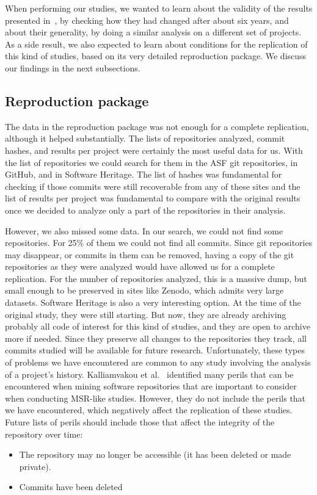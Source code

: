 When performing our studies, we wanted to learn about the validity of the results presented in~\cite{tufano2017there}, by checking how they had changed after about six years, and about their generality, by doing a similar analysis on a different set of projects. As a side result, we also expected to learn about conditions for the replication of this kind of studies, based on its very detailed reproduction package. We discuss our findings in the next subsections.

\subsection{Reproduction package}

The data in the reproduction package was not enough for a complete replication, although it helped substantially. The lists of repositories analyzed, commit hashes, and results per project were certainly the most useful data for us. With the list of repositories we could search for them in the ASF git repositories, in GitHub, and in Software Heritage. The list of hashes was fundamental for checking if those commits were still recoverable from any of these sites and the list of results per project was fundamental to compare with the original results once we decided to analyze only a part of the repositories in their analysis.

However, we also missed some data. In our search, we could not find some repositories. For 25\% of them we could not find all commits. Since git repositories may disappear, or commits in them can be removed, having a copy of the git repositories as they were analyzed would have allowed us for a complete replication. For the number of repositories analyzed, this is a massive dump, but small enough to be preserved in sites like Zenodo, which admits very large datasets. Software Heritage is also a very interesting option. At the time of the original study, they were still starting. But now, they are already archiving probably all code of interest for this kind of studies, and they are open to archive more if needed. Since they preserve all changes to the repositories they track, all commits studied will be available for future research.
Unfortunately, these types of problems we have encountered are common to any study involving the analysis of a project's history. Kalliamvakou et al.~\cite{kalliamvakou2016depth} identified many perils that can be encountered when mining software repositories that are important to consider when conducting MSR-like studies. 
However, they do not include the perils that we have encountered, which negatively affect the replication of these studies. 
Future lists of perils should include those that affect the integrity of the repository over time:
\begin{itemize}
    \item The repository may no longer be accessible (it has been deleted or made private).
    \item Commits have been deleted
\end{itemize}

